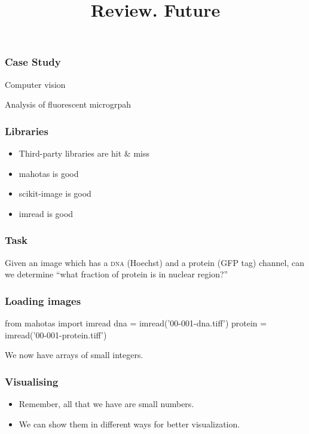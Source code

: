 
\title{Review. Future}

\frame{\maketitle}


\begin{frame}[fragile]
\frametitle{Case Study}

Computer vision

\bigskip
\bigskip

Analysis of fluorescent microgrpah

\end{frame}


\begin{frame}[fragile]
\frametitle{Libraries}

\begin{itemize}
\item Third-party libraries are hit \& miss
\item mahotas is good
\item scikit-image is good
\item imread is good
\end{itemize}

\end{frame}

\begin{frame}[fragile]
\frametitle{Task}
Given an image which has a \textsc{dna} (Hoechst) and a protein (GFP tag)
channel, can we determine ``what fraction of protein is in nuclear region?''
\end{frame}

\begin{frame}[fragile]
\frametitle{Loading images}

\begin{python}
from mahotas import imread
dna = imread('00-001-dna.tiff')
protein = imread('00-001-protein.tiff')
\end{python}

We now have arrays of small integers.
\end{frame}

\begin{frame}[fragile]
\frametitle{Visualising}
\begin{itemize}
\item Remember, all that we have are small numbers.
\item We can show them in different ways for better visualization.
\end{itemize}

\end{frame}

